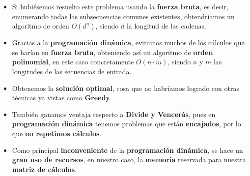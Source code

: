 \documentclass[10pt,a4paper]{article}
\begin{document}
\begin{itemize}
	\item Si hubiésemos resuelto este problema usando la \textbf{fuerza bruta}, es decir, enumerando todas las subsecuencias comunes existentes, obtendríamos un algoritmo de orden $O(d^n)$, siendo $d$ la longitud de las cadenas.
	\item Gracias a la \textbf{programación dinámica}, evitamos muchos de los cálculos que se harían en \textbf{fuerza bruta}, obteniendo así un algoritmo de \textbf{orden polinomial}, en este caso concretamente $O(n \cdot m)$, siendo $n$ y $m$ las longitudes de las secuencias de entrada.
	\item Obtenemos la \textbf{solución optimal}, cosa que no habríamos logrado con otras técnicas ya vistas como \textbf{Greedy}
	\item También ganamos ventaja respecto a \textbf{Divide y Vencerás}, pues en \textbf{programación dinámica} tenemos problemas que están \textbf{encajados}, por lo que \textbf{no repetimos cálculos}.
	\item Como principal \textbf{inconveniente} de la \textbf{programación dinámica}, se hace un \textbf{gran uso de recursos}, en nuestro caso, la \textbf{memoria} reservada para nuestra \textbf{matriz de cálculos}.
\end{itemize}
\end{document}
